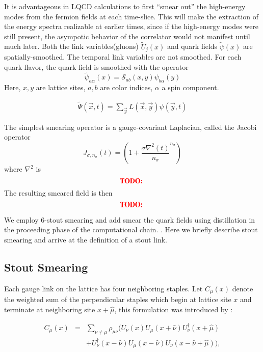 It is advantageous in LQCD calculations to first ``smear out'' the high-energy modes from the fermion fields at each time-slice. This will make the extraction of the energy spectra realizable at earlier times, since if the high-energy modes were still present, the asympotic behavior of the correlator would not manifest until much later. 
Both the link variables(gluons) $\tilde{U}_j(x)$ and quark fields $\tilde{\psi}(x)$ are spatially-smoothed. The temporal link variables are not smoothed. For each quark flavor, the quark field is smoothed with the operator
\begin{equation}
    \tilde{\psi}_{a\alpha}(x) = \mathcal{S}_{ab}(x,y) \psi_{b\alpha}(y)
\end{equation}
Here, $x,y$ are lattice sites, $a,b$ are color indices, $\alpha$ a spin component. 

\begin{align}
    \tilde{\Psi}(\vec{x},t) = \sum_{\vec{y}} L(\vec{x},\vec{y})\psi(\vec{y},t)
\end{align}

The simplest smearing operator is a gauge-covariant Laplacian, called the Jacobi operator \cite{peardon_novel_2009} 
\begin{equation}
    J_{\sigma,n_\sigma}(t) = \left(1 + \frac{\sigma\nabla^2(t)}{n_\sigma}^{n_\sigma}\right)
\end{equation} where $\nabla^2$ is 
\begin{equation}
    \textbf{\color{red}TODO: }
\end{equation}
The resulting smeared field is then 
\begin{equation}
    \textbf{\color{red}TODO: }
\end{equation}

We employ 6-stout smearing \cite{stout} and add smear the quark fields using distillation in the proceeding phase of the computational chain. \cite{peardon_novel_2009}. Here we briefly describe stout smearing and arrive at the definition of a stout link. 

\subsection{Stout Smearing}
Each gauge link on the lattice has four neighboring staples. 
Let $C_\mu(x)$ denote the weighted sum of the perpendicular staples which
begin at lattice site $x$ and terminate at neighboring site 
$x\!+\!\hat{\mu}$, this formulation was introduced by \cite{stout}:

\begin{eqnarray}
 C_\mu(x)&=&\sum_{\nu\neq \mu}\rho_{\mu\nu}\biggl(
 U_\nu(x) U_\mu(x\!+\!\hat{\nu}) U_\nu^\dagger(x\!+\!\hat{\mu})\nonumber\\
&&+ U^\dagger_\nu(x\!-\!\hat{\nu}) U_\mu(x\!-\!\hat{\nu})
  U_\nu(x\!-\!\hat{\nu}\!+\!\hat{\mu})
\biggr), \label{eq:Cdef}
\end{eqnarray}

